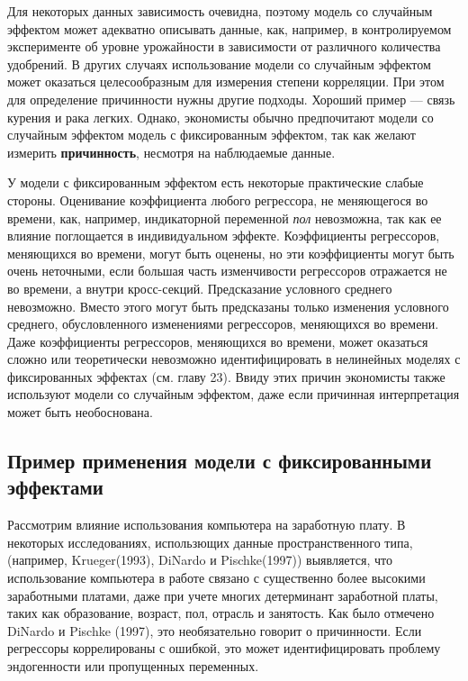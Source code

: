 Для некоторых данных зависимость очевидна, поэтому модель со случайным эффектом может адекватно описывать данные, как, например, в контролируемом эксперименте об уровне урожайности в зависимости от различного количества удобрений. В других случаях использование модели со случайным эффектом может оказаться целесообразным для измерения степени корреляции.  При этом для определение причинности нужны другие подходы. Хороший пример --- связь курения и рака легких. Однако, экономисты обычно предпочитают модели со случайным эффектом модель с фиксированным эффектом, так как желают измерить \textbf{причинность}, несмотря на наблюдаемые данные.

У модели с фиксированным эффектом есть некоторые практические слабые стороны. Оценивание коэффициента любого регрессора, не меняющегося во времени, как, например, индикаторной переменной {\it пол} невозможна, так как ее влияние поглощается в индивидуальном эффекте. Коэффициенты регрессоров, меняющихся во времени, могут быть оценены, но эти коэффициенты могут быть очень неточными, если большая часть изменчивости регрессоров отражается не во времени, а  внутри кросс-секций. Предсказание условного среднего невозможно. Вместо этого могут быть предсказаны только изменения условного среднего, обусловленного изменениями регрессоров, меняющихся во времени. Даже коэффициенты регрессоров, меняющихся во времени, может оказаться сложно или теоретически невозможно идентифицировать в нелинейных моделях с фиксированных эффектах (см. главу 23).  Ввиду этих причин экономисты также используют модели со случайным эффектом, даже если причинная интерпретация может быть необоснована.

\subsection{Пример применения модели с фиксированными эффектами}

Рассмотрим влияние использования компьютера на заработную плату.  В некоторых исследованиях, использющих данные пространственного типа, (например, Krueger(1993), DiNardo и Pischke(1997)) выявляется, что использование компьютера в работе связано с существенно более высокими заработными платами, даже при учете многих детерминант заработной платы, таких как образование, возраст, пол, отрасль и занятость. Как было отмечено DiNardo и Pischke (1997), это необязательно говорит о причинности. Если регрессоры коррелированы с ошибкой, это может идентифицировать проблему эндогенности или пропущенных переменных.

